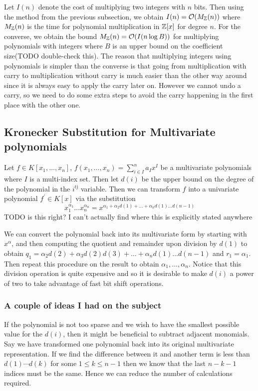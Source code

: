 Let $I(n)$ denote the cost of multiplying two integers with $n$ bits. Then using the method from the previous subsection, we obtain $I(n) = \mathcal O(M_{\mathbb Z}(n))$ where $M_{\mathbb Z}(n)$ is the time for polynomial multiplication in ${\mathbb Z}[x]$ for degree $n$. For the converse, we obtain the bound $M_{\mathbb Z}(n) = \mathcal O(I(n\log B))$ for multiplying polynomials with integers where $B$ is an upper bound on the coefficient size(TODO double-check this). The reason that multiplying integers using polynomials is simpler than the converse is that going from multiplication with carry to multiplication without carry is much easier than the other way around since it is always easy to apply the carry later on. However we cannot undo a carry, so we need to do some extra steps to avoid the carry happening in the first place with the other one.

\subsection{Kronecker Substitution for Multivariate polynomials}

Let $f \in K[x_1, \ldots, x_n]$, $f(x_1, \ldots, x_n) = \sum^n_{i \in I}a_Ix^I$ be a multivariate polynomials where $I$ is a multi-index set. Then let $d(i)$ be the upper bound on the degree of the polynomial in the $i^{\text{tj}}$ variable. Then we can transform $f$ into a univariate polynomial $f^\prime \in K[x]$ via the substitution
\[
    x_1^{\alpha_1}\ldots x_n^{\alpha_n} = x^{\alpha_1 + \alpha_2d(1) + \ldots + \alpha_n d(1)\ldots d(n-1)}
\]
TODO is this right? I can't actually find where this is explicitly stated anywhere

We can convert the polynomial back into its multivariate form by starting with $x^\alpha$, and then computing the quotient and remainder upon division by $d(1)$ to obtain $q_1 = \alpha_2d(2) + \alpha_3 d(2)d(3) + \ldots + \alpha_n d(1) \ldots d(n-1)$ and $r_1 = \alpha_1$. Then repeat this procedure on the result to obtain $\alpha_1, \ldots, \alpha_n$. Notice that this division operation is quite expensive and so it is desirable to make $d(i)$ a power of two to take advantage of fast bit shift operations.

\medskip

\subsubsection{A couple of ideas I had on the subject}

If the polynomial is not too sparse and we wish to have the smallest possible value for the $d(i)$, then it might be beneficial to subtract adjacent monomials. Say we have transformed one polynomial back into its original multivariate representation. If we find the difference between it and another term is less than $d(1)\cdots d(k)$ for some $1 \le k \le n-1$ then we know that the last $n - k - 1$ indices must be the same. Hence we can reduce the number of calculations required.

